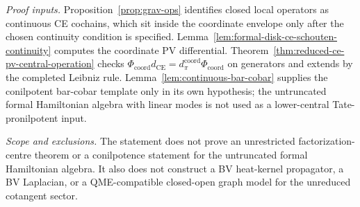 \begin{stmt}
  \emph{Proof inputs.}
  Proposition~\ref{prop:grav-ops} identifies closed local operators as
  continuous CE cochains, which sit inside the coordinate envelope only
  after the chosen continuity condition is specified.
  Lemma~\ref{lem:formal-disk-ce-schouten-continuity} computes the
  coordinate PV differential.  Theorem~\ref{thm:reduced-ce-pv-central-operation}
  checks
  \(\Phi_{\mathrm{coord}} d_{\mathrm{CE}}
  =d_\pi^{\mathrm{coord}}\Phi_{\mathrm{coord}}\) on generators and extends
  by the completed Leibniz rule.  Lemma~\ref{lem:continuous-bar-cobar}
  supplies the conilpotent bar-cobar template only in its own
  hypothesis; the untruncated formal Hamiltonian algebra with linear
  modes is not used as a lower-central Tate-pronilpotent input.

  \emph{Scope and exclusions.} The statement does not prove an unrestricted
  factorization-centre theorem or a conilpotence statement for the
  untruncated formal Hamiltonian algebra.  It also does not construct a
  BV heat-kernel propagator, a BV Laplacian, or a QME-compatible
  closed-open graph model for the unreduced cotangent sector.
\end{stmt}

